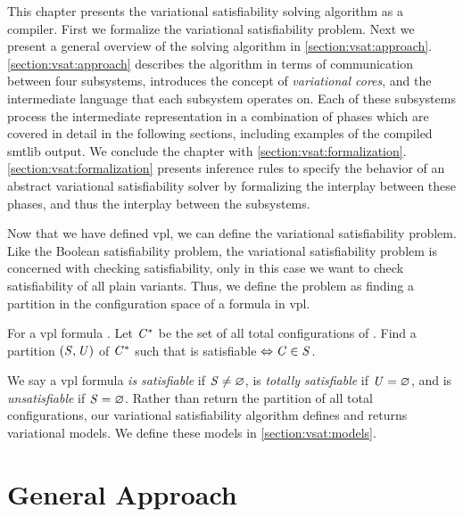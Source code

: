 \label{chapter:vsat}

This chapter presents the variational satisfiability solving algorithm as a
compiler. First we formalize the variational satisfiability problem. Next we
present a general overview of the solving algorithm in
\autoref{section:vsat:approach}. \autoref{section:vsat:approach} describes the
algorithm in terms of communication between four subsystems, introduces the
concept of \emph{variational cores}, and the intermediate language that each
subsystem operates on. Each of these subsystems process the intermediate
representation in a combination of phases which are covered in detail in the
following sections, including examples of the compiled \acl{smtlib} output. We
conclude the chapter with \autoref{section:vsat:formalization}.
\autoref{section:vsat:formalization} presents inference rules to specify the
behavior of an abstract variational satisfiability solver by formalizing the
interplay between these phases, and thus the interplay between the subsystems.

Now that we have defined \ac{vpl}, we can define the variational satisfiability
problem. Like the Boolean satisfiability problem, the variational satisfiability
problem is concerned with checking satisfiability, only in this case we want to
check satisfiability of all plain variants. Thus, we define the problem as
finding a partition in the configuration space of a formula in \ac{vpl}.

\begin{definition}
  For a \ac{vpl} formula \fV{}. Let $\mathit{C}{}^{*}$ be the set of all
  total configurations of \fV{}. Find a partition $\mathit{(S,U)}$ of
  $\mathit{C}{}^{*}$ such that \sem[\configuration{}]{\fV{}} is satisfiable
   $\Leftrightarrow \mathit{C}{} \in \mathit{S}$.
\end{definition}

We say a \ac{vpl} formula \fV{} \emph{is satisfiable} if $\mathit{S} \neq
\varnothing$, \fV{} is \emph{totally satisfiable} if $\mathit{U} = \varnothing$, and
\fV{} is \emph{unsatisfiable} if $\mathit{S} = \varnothing$. Rather than return the
partition of all total configurations, our variational satisfiability algorithm
defines and returns variational models. We define these models in
\autoref{section:vsat:models}.

\section{General Approach}


